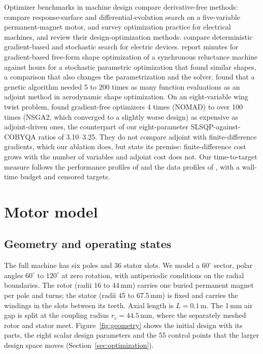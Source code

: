 \documentclass{anvil-paper}
\begin{document}
Optimizer benchmarks in machine design compare derivative-free methods:
\citet{duan2013review} compare response-surface and differential-evolution
search on a five-variable permanent-magnet motor, and
\citet{bramerdorfer2018modern} survey optimization practice for electrical
machines, and \citet{lei2017review} review their design-optimization
methods. \citet{ion2018robust} compare deterministic gradient-based and
stochastic search for electric devices. \citet{gangl2022multi} report
minutes for gradient-based free-form shape optimization of a synchronous
reluctance machine against hours for a stochastic parametric optimization
that found similar shapes, a comparison that also changes the
parametrization and the solver. \citet{zingg2008comparative}
found that a genetic algorithm needed 5 to 200 times as many function
evaluations as an adjoint method in aerodynamic shape optimization.
On an eight-variable wing twist problem, \citet{yu2018influence} found
gradient-free optimizers 4 times (NOMAD) to over 100 times (NSGA2, which
converged to a slightly worse design) as expensive as adjoint-driven ones,
the counterpart of our eight-parameter
SLSQP-against-COBYQA ratios of 3.10--3.25. They do not compare adjoint with
finite-difference gradients, which our ablation does, but state its premise:
finite-difference cost grows with the number of variables and adjoint cost does not. Our
time-to-target measure follows the performance profiles of
\citet{dolan2002benchmarking} and the data profiles of
\citet{more2009benchmarking}, with a wall-time budget and censored
targets.

\section{Motor model}\label{sec:model}
\subsection{Geometry and operating states}
The full machine has six poles and 36 stator slots. We model a
$60^\circ$ sector, polar angles $60^\circ$ to $120^\circ$ at zero
rotation, with antiperiodic conditions on the radial boundaries. The rotor
(radii 16 to 44\,mm) carries one buried permanent magnet per pole and
turns; the stator (radii 45 to 67.5\,mm) is fixed and carries the windings
in the slots between its teeth. Axial length is $L=0.1$\,m. The 1\,mm air
gap is split at the coupling radius $r_c=44.5$\,mm, where the separately
meshed rotor and stator meet. Figure~\ref{fig:geometry} shows the initial
design with its parts, the eight scalar design parameters and the 55
control points that the larger design space moves
(Section~\ref{sec:optimization}).
\end{document}
